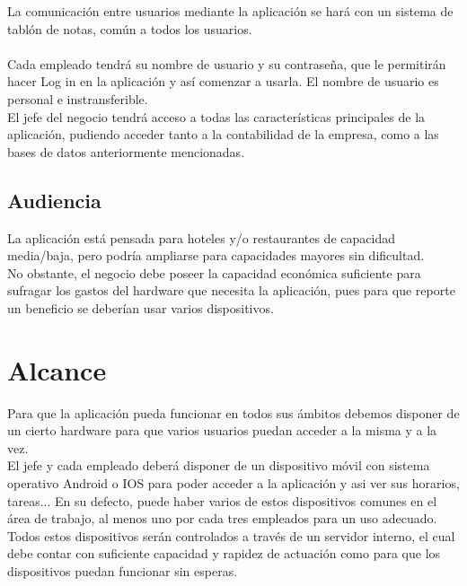 \documentclass[spanish,a4paper,12pt]{report}	%
\begin{document}
La comunicación entre usuarios mediante la aplicación se hará con un sistema de tablón de notas, común a todos los usuarios.\\\\
Cada empleado tendrá su nombre de usuario y su contraseña, que le permitirán hacer Log in en la aplicación y así comenzar a usarla. El nombre de usuario es personal e instransferible.\\

El jefe del negocio tendrá acceso a todas las características principales de la aplicación, pudiendo acceder tanto a la contabilidad de la empresa, como a las bases de datos anteriormente mencionadas. \\



		\subsection{Audiencia} La aplicación está pensada para hoteles y/o restaurantes de capacidad media/baja, pero podría ampliarse para capacidades mayores sin dificultad. \\

No obstante, el negocio debe poseer la capacidad económica suficiente para sufragar los gastos del hardware que necesita la aplicación, pues para que reporte un beneficio se deberían usar varios dispositivos.

\section{Alcance}

Para que la aplicación pueda funcionar en todos sus ámbitos debemos disponer de un cierto hardware para que varios usuarios puedan acceder a la misma y a la vez.\\

 El jefe y cada empleado deberá disponer de un dispositivo móvil con sistema operativo Android o IOS para poder acceder a la aplicación y asi ver sus horarios, tareas... En su defecto, puede haber varios de estos dispositivos comunes en el área de trabajo, al menos uno por cada tres empleados para un uso adecuado. \\

Todos estos dispositivos serán controlados a través de un servidor interno, el cual debe contar con suficiente capacidad y rapidez de actuación como para que los dispositivos puedan funcionar sin esperas.\\
\end{document}
